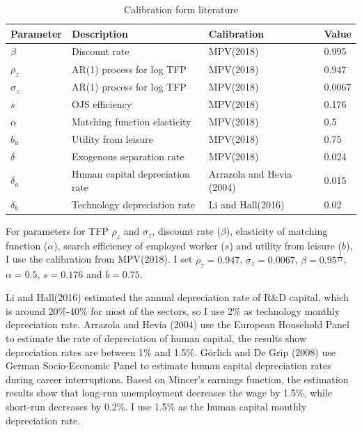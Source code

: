 \documentclass[12pt]{article}
\newcommand{\1}{\mathbb{1}}
\begin{document}
\begin{table}[h!]
\scriptsize
\begin{center}
\begin{tabular}{llll}
\hline \hline
Parameter     &       Description      & Calibration &  Value                    \\
\hline 
$\beta$ & Discount rate & MPV(2018) & 0.995 \\
$\rho_z$   &  AR(1) process for log TFP & MPV(2018) & 0.947 \\
$\sigma_z$ &  AR(1) process for log TFP & MPV(2018) & 0.0067 \\
$s$ & OJS efficiency & MPV(2018) & 0.176\\
$\alpha$ & Matching function elasticity & MPV(2018) & 0.5\\
$b_u$ & Utility from leisure & MPV(2018) & 0.75\\
$\delta$ & Exogenous separation rate & MPV(2018) & 0.024 \\
$\delta_a$ & Human capital depreciation rate & Arrazola and Hevia (2004) & 0.015\\
$\delta_b$ & Technology depreciation rate & Li and Hall(2016) & 0.02 \\
\hline 
\end{tabular}
\end{center}
\caption{Calibration form literature}
\label{Calibration1}
\end{table}

For parameters for TFP $\rho_z$ and $\sigma_z$, discount rate ($\beta$), elasticity of matching function ($\alpha$), search efficiency of employed worker ($s$) and utility from leisure ($b$), I use the calibration from MPV(2018)\nocite{MPV2018}. I set $\rho_z = 0.947$, $\sigma_z = 0.0067$, $\beta = 0.95^{\frac{1}{12}}$, $\alpha = 0.5$, $s = 0.176$ and $b = 0.75$. 

Li and Hall(2016)\nocite{LiHall2016} estimated the annual depreciation rate of R\&D capital, which is around 20\%-40\% for most of the sectors, so I use 2\% as technology monthly depreciation rate. Arrazola and Hevia (2004)\nocite{ArrazolaHevia2004} use the European Household Panel to estimate the rate of depreciation of human capital, the results show depreciation rates are between 1\% and 1.5\%. G{\"o}rlich and De Grip (2008)\nocite{GorlichDeGrip2008} use German Socio-Economic Panel to estimate human capital depreciation rates during career interruptions. Based on Mincer’s earnings function, the estimation results show that long-run unemployment decreases the wage by 1.5\%, while short-run decreases by 0.2\%. I use 1.5\% as the human capital monthly depreciation rate. 
\end{document}
